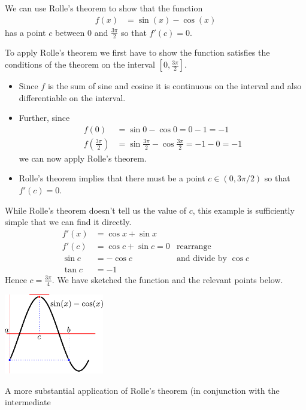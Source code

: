 \begin{eg}
We can use Rolle's theorem to show that the function
\begin{align*}
  f(x) &= \sin(x)-\cos(x)
\end{align*}
has a point $c$ between $0$ and $\frac{3\pi}{2}$ so that $f'(c)=0$.


To apply Rolle's theorem we first have to show the function satisfies the conditions of
the theorem on the interval $[0,\frac{3\pi}{2}]$.
\begin{itemize}
 \item Since $f$ is the sum of sine and cosine it is continuous on the interval and also
differentiable on the interval.
\item Further, since
\begin{align*}
  f(0) &= \sin 0 - \cos 0 = 0-1 = -1  \\
  f\left(\frac{3\pi}{2}\right) &= \sin\frac{3\pi}{2} - \cos\frac{3\pi}{2} = -1-0 = -1
\end{align*}
  we can now apply Rolle's theorem.
\item Rolle's theorem implies that there must be a point $c \in (0,3\pi/2)$ so that
$f'(c) =0$.
\end{itemize}
While Rolle's theorem doesn't tell us the value of $c$, this example is sufficiently
simple that we can find it directly.
\begin{align*}
  f'(x) &= \cos x + \sin x\\
  f'(c) &= \cos c + \sin c  =  0 & \text{rearrange}\\
  \sin c&= - \cos c & \text{and divide by $\cos c$} \\
  \tan c &= -1
\end{align*}
Hence $c = \frac{3\pi}{4}$. We have sketched the function and the relevant points below.
\begin{efig}
\begin{center}
 \includegraphics[height=3.5cm]{extra/rolle_sketch}
\end{center}
\end{efig}
\end{eg}
A more substantial application of Rolle's theorem (in conjunction with the intermediate

